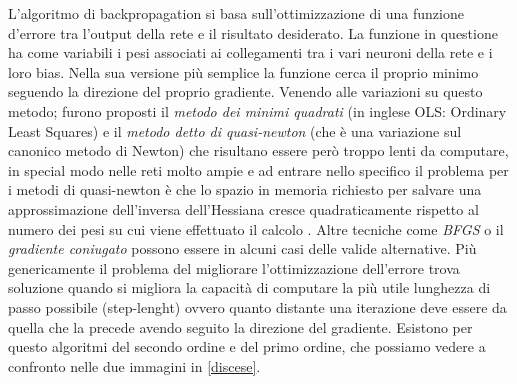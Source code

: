 L'algoritmo di backpropagation si basa sull'ottimizzazione di una funzione d'errore tra l'output della rete e il risultato desiderato. La funzione in questione ha come variabili i pesi associati ai collegamenti tra i vari neuroni della rete e i loro bias. Nella sua versione più semplice la funzione cerca il proprio minimo seguendo la direzione del proprio gradiente.
Venendo alle variazioni su questo metodo; furono proposti il \textit{metodo dei minimi quadrati} (in inglese OLS: Ordinary Least Squares) e il \textit{metodo detto di quasi-newton} (che è una variazione sul canonico metodo di Newton) che risultano essere però troppo lenti da computare, in special modo nelle reti molto ampie e ad entrare nello specifico il problema per i metodi di quasi-newton è che lo spazio in memoria richiesto per salvare una approssimazione dell'inversa dell'Hessiana cresce quadraticamente rispetto al numero dei pesi su cui viene effettuato il calcolo \cite{saito1997partial}. Altre tecniche come \textit{BFGS} o il \textit{gradiente coniugato} possono essere in alcuni casi delle valide alternative.
Più genericamente il problema del migliorare l'ottimizzazione dell'errore trova soluzione quando si migliora la capacità di computare la più utile lunghezza di passo possibile (step-lenght) ovvero quanto distante una iterazione deve essere da quella che la precede avendo seguito la direzione del gradiente.
Esistono per questo algoritmi del secondo ordine e del primo ordine, che possiamo vedere a confronto nelle due immagini in \ref{discese}.

\vspace{5 mm}

